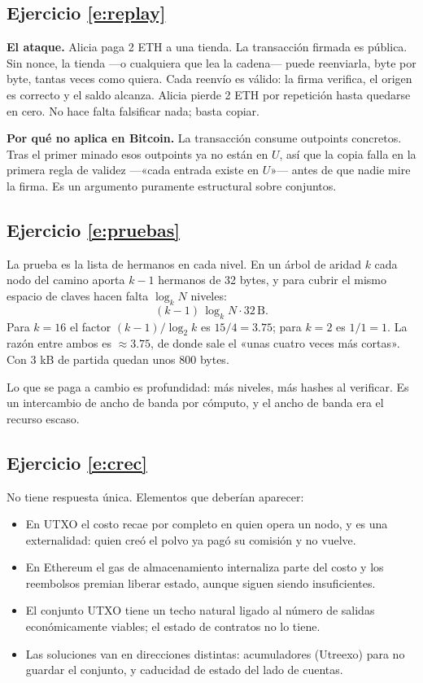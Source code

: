 \documentclass[11pt,a4paper]{article}
\theoremstyle{definition}
\theoremstyle{plain}
\theoremstyle{remark}
\begin{document}
\subsection*{Ejercicio \ref{e:replay}}
\textbf{El ataque.} Alicia paga 2 ETH a una tienda. La transacción firmada es
pública. Sin nonce, la tienda —o cualquiera que lea la cadena— puede reenviarla,
byte por byte, tantas veces como quiera. Cada reenvío es válido: la firma
verifica, el origen es correcto y el saldo alcanza. Alicia pierde 2 ETH por
repetición hasta quedarse en cero. No hace falta falsificar nada; basta copiar.

\textbf{Por qué no aplica en Bitcoin.} La transacción consume outpoints
concretos. Tras el primer minado esos outpoints ya no están en $U$, así que la
copia falla en la primera regla de validez —«cada entrada existe en $U$»— antes
de que nadie mire la firma. Es un argumento puramente estructural sobre
conjuntos.

\subsection*{Ejercicio \ref{e:pruebas}}
La prueba es la lista de hermanos en cada nivel. En un árbol de aridad $k$ cada
nodo del camino aporta $k-1$ hermanos de 32 bytes, y para cubrir el mismo espacio
de claves hacen falta $\log_k N$ niveles:
\[
  (k-1)\,\log_k N \cdot 32\,\text{B}.
\]
Para $k = 16$ el factor $(k-1)/\log_2 k$ es $15/4 = 3.75$; para $k = 2$ es
$1/1 = 1$. La razón entre ambos es $\approx 3.75$, de donde sale el «unas cuatro
veces más cortas». Con 3 kB de partida quedan unos 800 bytes.

Lo que se paga a cambio es profundidad: más niveles, más hashes al verificar. Es
un intercambio de ancho de banda por cómputo, y el ancho de banda era el recurso
escaso.

\subsection*{Ejercicio \ref{e:crec}}
No tiene respuesta única. Elementos que deberían aparecer:

\begin{itemize}
  \item En UTXO el costo recae por completo en quien opera un nodo, y es una
        externalidad: quien creó el polvo ya pagó su comisión y no vuelve.
  \item En Ethereum el gas de almacenamiento internaliza parte del costo y los
        reembolsos premian liberar estado, aunque siguen siendo insuficientes.
  \item El conjunto UTXO tiene un techo natural ligado al número de salidas
        económicamente viables; el estado de contratos no lo tiene.
  \item Las soluciones van en direcciones distintas: acumuladores (Utreexo) para
        no guardar el conjunto, y caducidad de estado del lado de cuentas.
\end{itemize}
\end{document}
